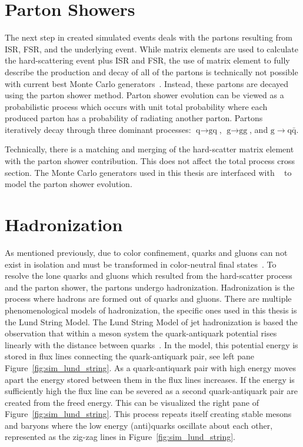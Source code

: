 \section{Parton Showers}
The next step in created simulated events deals with the partons resulting from ISR,
FSR, and the underlying event. 
While matrix elements are used to calculate the hard-scattering event plus ISR and FSR, 
the use of matrix element to fully describe the production and decay of all of the
partons is technically not possible with current best Monte Carlo generators~\cite{PhysRevD.94.074005}. 
Instead, these partons are decayed using the parton shower method. 
Parton shower evolution can be viewed as a probabilistic process 
which occurs with unit total probability where each produced parton has a probability
of radiating another parton. Partons iteratively decay through three 
dominant processes: $\textrm{q} \to \textrm{gq}$, $\textrm{g} \to \textrm{gg}$, 
and $\textrm{g} \to \textrm{q}\bar{\textrm{q}}$. 

Technically, there is a matching and merging of the hard-scatter matrix element with the
parton shower contribution. This does not affect the total process cross section.
The Monte Carlo generators used in this thesis are interfaced with 
~\cite{Sjostrand:2014zea} to model the parton shower evolution.



\section{Hadronization}
As mentioned previously, due to color confinement, quarks and gluons can not exist in isolation
and must be transformed in color-neutral final states~\cite{Hoche:2014rga}. 
To resolve the lone quarks and gluons which resulted from the hard-scatter process and the parton 
shower, the partons undergo hadronization. Hadronization is the process where hadrons are formed 
out of quarks and gluons. There are multiple phenomenological models of hadronization, the
specific ones used in this thesis is the Lund String Model. The Lund String Model of jet
hadronization is based the observation that within a meson system the quark-antiquark 
potential rises linearly with the distance between quarks~\cite{Bali:1992ab}. In the model, this
potential energy is stored in flux lines connecting the quark-antiquark pair, see left pane 
Figure~\ref{fig:sim_lund_string}. As a quark-antiquark 
pair with high energy moves apart the energy stored between them in the flux lines increases. If the energy
is sufficiently high the flux line can be severed as a second quark-antiquark pair are created from
the freed energy. This can be visualized the right pane of Figure~\ref{fig:sim_lund_string}.
This process repeats itself creating stable mesons and baryons where the low energy (anti)quarks
oscillate about each other, represented as the zig-zag lines in Figure~\ref{fig:sim_lund_string}.

